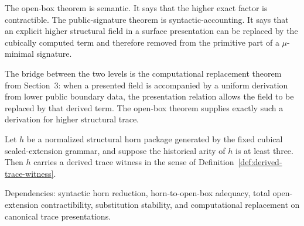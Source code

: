 \documentclass{lmcs}
\begin{document}
The open-box theorem is semantic.  It says that the higher exact factor is contractible.  The
public-signature theorem is syntactic-accounting.  It says that an explicit higher structural
field in a surface presentation can be replaced by the cubically computed term and therefore
removed from the primitive part of a \(\mu\)-minimal signature.

The bridge between the two levels is the computational replacement theorem from
Section~3: when a presented field is accompanied by a uniform derivation from lower public
boundary data, the presentation relation allows the field to be replaced by that derived term.
The open-box theorem supplies exactly such a derivation for higher structural trace.

\begin{thm}
\label{thm:higher-structural-derived-trace}
Let \(h\) be a normalized structural horn package generated by the fixed cubical
sealed-extension grammar, and suppose the historical arity of \(h\) is at least three.  Then
\(h\) carries a derived trace witness in the sense of
Definition~\ref{def:derived-trace-witness}.

Dependencies: syntactic horn reduction, horn-to-open-box adequacy, total open-extension
contractibility, substitution stability, and computational replacement on canonical trace
presentations.
\end{thm}
\end{document}
